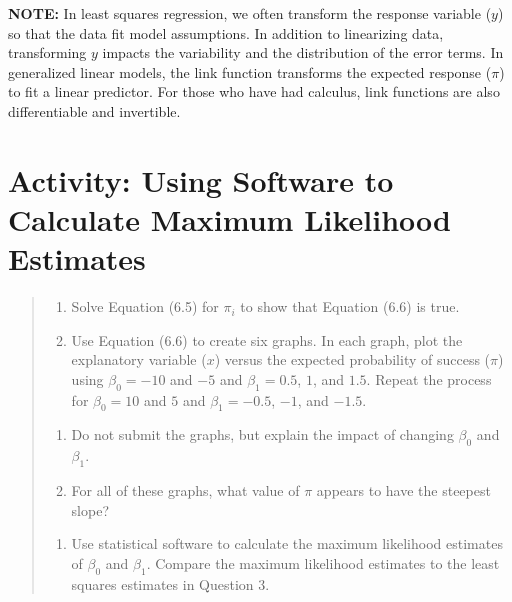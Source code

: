 \documentclass[
]{report}
\providecommand{\tightlist}{%
  \setlength{\itemsep}{0pt}\setlength{\parskip}{0pt}}
\begin{document}
\large

\textbf{NOTE:} In least squares regression, we often transform the response variable (\(y\)) so that the data fit model assumptions. In addition to linearizing data, transforming \(y\) impacts the variability and the distribution of the error terms. In generalized linear models, the link function transforms the expected response (\(\pi\)) to fit a linear predictor. For those who have had calculus, link functions are also differentiable and invertible.
\normalsize

\hypertarget{activity-using-software-to-calculate-maximum-likelihood-estimates}{%
\section*{Activity: Using Software to Calculate Maximum Likelihood Estimates}\label{activity-using-software-to-calculate-maximum-likelihood-estimates}}

\begin{quote}
\begin{enumerate}
\def\labelenumi{\arabic{enumi}.}
\setcounter{enumi}{3}
\tightlist
\item
  Solve Equation (6.5) for \(\pi_i\) to show that Equation (6.6) is true.\\
\item
  Use Equation (6.6) to create six graphs. In each graph, plot the explanatory variable (\(x\)) versus the expected probability of success (\(\pi\)) using \(\beta_0 = -10\) and \(-5\) and \(\beta_1 = 0.5\), \(1\), and \(1.5\). Repeat the process for \(\beta_0 = 10\) and \(5\) and \(\beta_1 = -0.5\), \(-1\), and \(-1.5\).\\
\end{enumerate}

\begin{enumerate}
\def\labelenumi{\alph{enumi}.}
\tightlist
\item
  Do not submit the graphs, but explain the impact of changing \(\beta_0\) and \(\beta_1\).\\
\item
  For all of these graphs, what value of \(\pi\) appears to have the steepest slope?\\
\end{enumerate}

\begin{enumerate}
\def\labelenumi{\arabic{enumi}.}
\setcounter{enumi}{5}
\tightlist
\item
  Use statistical software to calculate the maximum likelihood estimates of \(\beta_0\) and \(\beta_1\). Compare the maximum likelihood estimates to the least squares estimates in Question 3.
\end{enumerate}
\end{quote}
\end{document}
